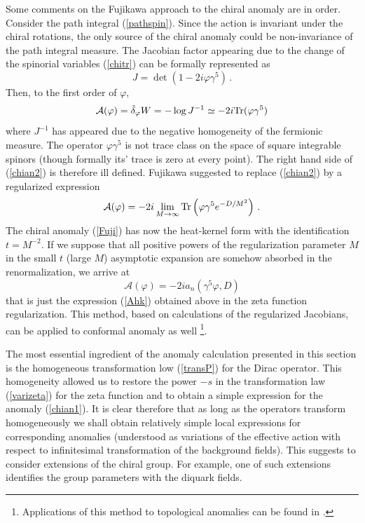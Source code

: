 Some comments on the Fujikawa approach 
\cite{Fujikawa:1979ay,Fujikawa:1980eg} 
to the chiral anomaly are in order.
Consider the path integral (\ref{pathspin}).
Since the action is invariant under the chiral rotations,
the only source of the chiral anomaly could be non-invariance
of the path integral measure. The Jacobian factor appearing due
to the change of the spinorial variables (\ref{chitr}) 
can be formally represented as
\begin{equation}
J=\det (1-2i\varphi\gamma^5 )\,. \label{Jac1}
\end{equation}
Then, to the first order of $\varphi$,
\begin{equation}
\mathcal{ A}(\varphi )=
\tilde\delta_\varphi W =-\log J^{-1} \simeq -2i{\rm Tr}(\varphi\gamma^5 ) 
\label{chian2}
\end{equation}
where $J^{-1}$ has appeared due to the negative homogeneity
of the fermionic measure. The operator $\varphi\gamma^5$ is not
trace class on the space of square integrable spinors (though
formally its' trace is zero at every point). The right hand side
of (\ref{chian2}) is therefore ill defined. Fujikawa suggested
to replace (\ref{chian2}) by a regularized expression
\begin{equation}
\mathcal{ A}(\varphi )= -2i \lim_{M\to \infty}
{\rm Tr}\left( \varphi\gamma^5 e^{-D/M^2} \right) \,.
\label{Fuji}
\end{equation}
The chiral anomaly (\ref{Fuji}) has now the heat-kernel
form with the identification $t=M^{-2}$. If we suppose that
all positive powers of the regularization parameter $M$ in
the small $t$ (large $M$) asymptotic expansion are somehow
absorbed in the renormalization, we arrive at 
\begin{equation}
\mathcal{ A}(\varphi ) =-2i a_n (\gamma^5\varphi, D)
\label{Fuji2} 
\end{equation}
that is just the expression (\ref{Ahk}) obtained above
in the zeta function regularization.
This method, based on calculations of the regularized
Jacobians, can be applied to conformal anomaly as well
\cite{Fujikawa:1980vr}\footnote{Applications of this method
to topological anomalies can be found in \cite{Fujikawa:2003gi}.
}.

The most essential ingredient of the anomaly calculation
presented in this section is the homogeneous transformation
low (\ref{transP}) for the Dirac operator. This homogeneity
allowed us to restore the power $-s$ in the transformation
law (\ref{varizeta}) for the zeta function and to obtain a
simple expression for the anomaly (\ref{chian1}). It is clear
therefore that as long as the operators transform homogeneously
we shall obtain relatively simple local expressions for
corresponding anomalies (understood as variations of the
effective action with respect to infinitesimal transformation
of the background fields). This suggests to consider extensions
of the chiral group. For example, one of such extensions 
\cite{Novozhilov:1995he}
identifies the group parameters with the diquark fields.

